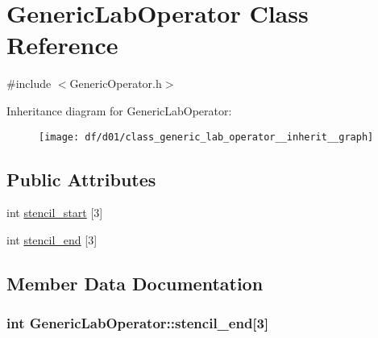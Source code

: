 \hypertarget{class_generic_lab_operator}{}\section{Generic\+Lab\+Operator Class Reference}
\label{class_generic_lab_operator}


{\ttfamily \#include $<$Generic\+Operator.\+h$>$}



Inheritance diagram for Generic\+Lab\+Operator\+:\nopagebreak
\begin{figure}[H]
\begin{center}
\leavevmode
\texttt{[image: df/d01/class\_generic\_lab\_operator\_\_inherit\_\_graph]}
\end{center}
\end{figure}
\subsection*{Public Attributes}
\begin{DoxyCompactItemize}
\item 
int \hyperlink{class_generic_lab_operator_a007ab6ad6deb024d839d1d03241672c0}{stencil\+\_\+start} \mbox{[}3\mbox{]}
\item 
int \hyperlink{class_generic_lab_operator_a4daf37ba8c5a018f2b779d8636aba63f}{stencil\+\_\+end} \mbox{[}3\mbox{]}
\end{DoxyCompactItemize}


\subsection{Member Data Documentation}
\hypertarget{class_generic_lab_operator_a4daf37ba8c5a018f2b779d8636aba63f}{}
\subsubsection[{stencil\+\_\+end}]{\setlength{\rightskip}{0pt plus 5cm}int Generic\+Lab\+Operator\+::stencil\+\_\+end\mbox{[}3\mbox{]}}\label{class_generic_lab_operator_a4daf37ba8c5a018f2b779d8636aba63f}
\hypertarget{class_generic_lab_operator_a007ab6ad6deb024d839d1d03241672c0}{}
